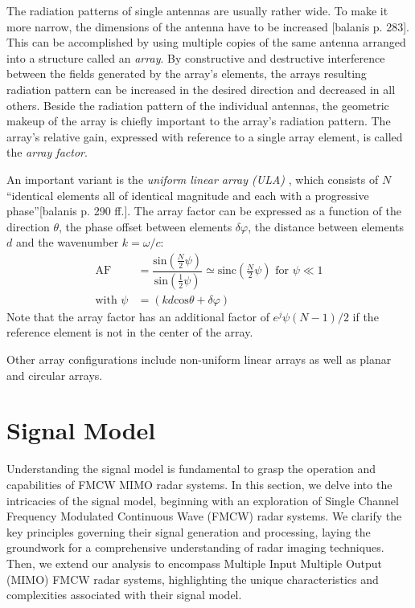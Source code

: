 The radiation patterns of single antennas are usually rather wide.
To make it more narrow, the dimensions of the antenna have to be increased [balanis p. 283].
This can be accomplished by using multiple copies of the same antenna arranged into a structure called an \emph{array}.
By constructive and destructive interference between the fields generated by the array's elements,
the arrays resulting radiation pattern can be increased in the desired direction and decreased in all others.
Beside the radiation pattern of the individual antennas, 
the geometric makeup of the array is chiefly important to the array's radiation pattern.
The array's relative gain, expressed with reference to a single array element,
is called the \emph{array factor}.

An important variant is the \emph{uniform linear array (ULA)} ,
which consists of $N$
``identical elements all of identical magnitude and each with a progressive phase''[balanis p. 290 ff.].
The array factor can be expressed as a function of the direction $\theta$,
the phase offset between elements $\delta \varphi$, the distance between elements $d$
and the wavenumber $k=\omega/c$:
\begin{align}
    \text{AF} &= \dfrac{\text{sin}\left(\frac{N}{2}\psi\right)}{\text{sin}\left(\frac{1}{2}\psi\right)}
    \simeq \text{sinc}\left(\frac{N}{2}\psi\right) \text{ for } \psi \ll 1 \\
    \text{with } \psi &= (kd\text{cos}\theta + \delta\varphi)
\end{align}
Note that the array factor has an additional factor of $e^j\psi(N-1)/2$
if the reference element is not in the center of the array.

Other array configurations include non-uniform linear arrays as well as planar and circular arrays. 

\section{Signal Model}
Understanding the signal model is fundamental to grasp the operation and capabilities of FMCW MIMO radar systems.
In this section, we delve into the intricacies of the signal model,
beginning with an exploration of Single Channel Frequency Modulated Continuous Wave (FMCW) radar systems.
We clarify the key principles governing their signal generation and processing,
laying the groundwork for a comprehensive understanding of radar imaging techniques.
Then, we extend our analysis to encompass Multiple Input Multiple Output (MIMO) FMCW radar systems,
highlighting the unique characteristics and complexities associated with their signal model.

